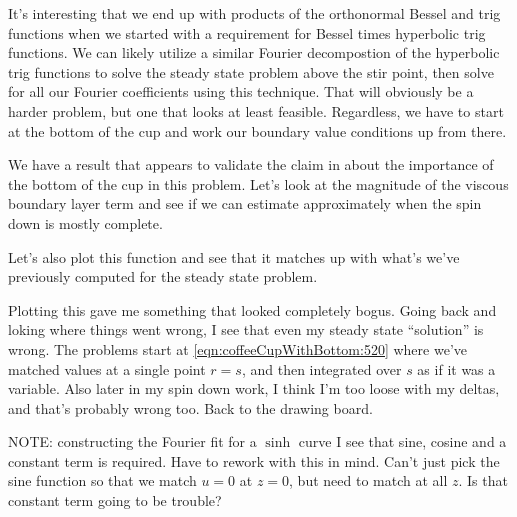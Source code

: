 It's interesting that we end up with products of the orthonormal Bessel and trig functions when we started with a requirement for Bessel times hyperbolic trig functions.  We can likely utilize a similar Fourier decompostion of the hyperbolic trig functions to solve the steady state problem above the stir point, then solve for all our Fourier coefficients using this technique.  That will obviously be a harder problem, but one that looks at least feasible.  Regardless, we have to start at the bottom of the cup and work our boundary value conditions up from there.  

We have a result that appears to validate the claim in \citep{acheson1990elementary} about the importance of the bottom of the cup in this problem.  Let's look at the magnitude of the viscous boundary layer term and see if we can estimate approximately when the spin down is mostly complete.

Let's also plot this function and see that it matches up with what's we've previously computed for the steady state problem.

Plotting this gave me something that looked completely bogus.  Going back and loking where things went wrong, I see that even my steady state ``solution'' is wrong.  The problems start at \ref{eqn:coffeeCupWithBottom:520} where we've matched values at a single point $r = s$, and then integrated over $s$ as if it was a variable.  Also later in my spin down work, I think I'm too loose with my deltas, and that's probably wrong too.  Back to the drawing board.

NOTE: constructing the Fourier fit for a $\sinh$ curve I see that sine, cosine and a constant term is required.  Have to rework with this in mind.  Can't just pick the sine function so that we match $u = 0$ at $z = 0$, but need to match at all $z$.  Is that constant term going to be trouble?
